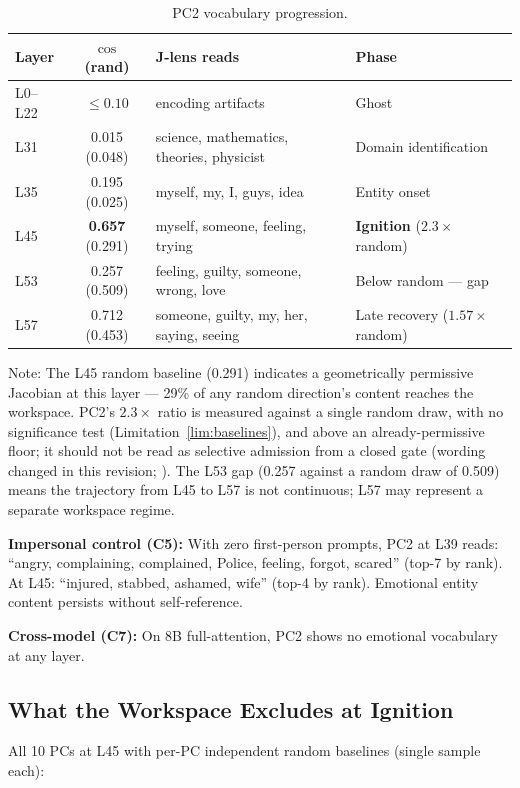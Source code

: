 \documentclass[11pt,a4paper]{article}
\begin{document}
\begin{table}[H]
\centering
\caption{PC2 vocabulary progression.}
\label{tab:pc2}
\small
\begin{tabular}{lcp{4.5cm}p{4cm}}
\toprule
Layer & $\cos$ (rand) & J-lens reads & Phase \\
\midrule
L0--L22 & $\leq 0.10$ & encoding artifacts & Ghost \\
L31 & 0.015 (0.048) & science, mathematics, theories, physicist & Domain identification \\
L35 & 0.195 (0.025) & myself, my, I, guys, idea & Entity onset \\
L45 & \textbf{0.657} (0.291) & myself, someone, feeling, trying & \textbf{Ignition} ($2.3\times$ random) \\
L53 & 0.257 (0.509) & feeling, guilty, someone, wrong, love & Below random --- gap \\
L57 & 0.712 (0.453) & someone, guilty, my, her, saying, seeing & Late recovery ($1.57\times$ random) \\
\bottomrule
\end{tabular}
\end{table}

Note: The L45 random baseline (0.291) indicates a geometrically permissive Jacobian at this layer --- 29\% of any random direction's content reaches the workspace. PC2's $2.3\times$ ratio is measured against a single random draw, with no significance test (Limitation~\ref{lim:baselines}), and above an already-permissive floor; it should not be read as selective admission from a closed gate (wording changed in this revision; ). The L53 gap (0.257 against a random draw of 0.509) means the trajectory from L45 to L57 is not continuous; L57 may represent a separate workspace regime.

\textbf{Impersonal control (C5):} With zero first-person prompts, PC2 at L39 reads: ``angry, complaining, complained, Police, feeling, forgot, scared'' (top-7 by rank). At L45: ``injured, stabbed, ashamed, wife'' (top-4 by rank). Emotional entity content persists without self-reference.

\textbf{Cross-model (C7):} On 8B full-attention, PC2 shows no emotional vocabulary at any layer.

\subsection{What the Workspace Excludes at Ignition}

All 10 PCs at L45 with per-PC independent random baselines (single sample each):
\end{document}
